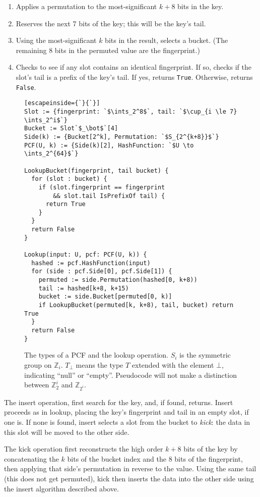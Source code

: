 \documentclass[letterpaper, 11pt]{article}
\newcommand{\ints}{\mathbb{Z}}
\begin{document}
\begin{enumerate}
\item Applies a permutation to the most-significant $k+8$ bits in the key.
\item Reserves the next 7 bits of the key; this will be the key's tail.
\item Using the most-significant $k$ bits in the result, selects a bucket.
(The remaining 8 bits in the permuted value are the fingerprint.)
\item Checks to see if any slot contains an identical fingerprint.
If so, checks if the slot's tail is a prefix of the key's tail.
If yes, returns \verb|True|.
Otherwise, returns \verb|False|.
\end{enumerate}

\begin{figure}
\begin{lstlisting}[escapeinside={`}{`}]
Slot := {fingerprint: `$\ints_2^8$`, tail: `$\cup_{i \le 7} \ints_2^i$`}
Bucket := Slot`$_\bot$`[4]
Side(k) := {Bucket[2^k], Permutation: `$S_{2^{k+8}}$`}
PCF(U, k) := {Side(k)[2], HashFunction: `$U \to \ints_2^{64}$`}

LookupBucket(fingerprint, tail bucket) {
  for (slot : bucket) {
    if (slot.fingerprint == fingerprint
        && slot.tail IsPrefixOf tail) {
      return True
    }
  }
  return False
}

Lookup(input: U, pcf: PCF(U, k)) {
  hashed := pcf.HashFunction(input)
  for (side : pcf.Side[0], pcf.Side[1]) {
    permuted := side.Permutation(hashed[0, k+8))
    tail := hashed[k+8, k+15)
    bucket := side.Bucket[permuted[0, k)]
    if LookupBucket(permuted[k, k+8), tail, bucket) return True
  }
  return False
}
\end{lstlisting}
\caption{The types of a PCF and the lookup operation.
  $S_i$ is the symmetric group on $\ints_i$.
  $T_\bot$ means the type $T$ extended with the element $\bot$, indicating ``null'' or ``empty''.
  Pseudocode will not make a distinction between $\ints_2^i$ and $\ints_{2^i}$.
}
\end{figure}

The insert operation, first search for the key, and, if found, returns.
Insert proceeds as in lookup, placing the key's fingerprint and tail in an empty slot, if one is.
If none is found, insert selects a slot from the bucket to {\em kick}: the data in this slot will be moved to the other side.

The kick operation first reconstructs the high order $k + 8$ bits of the key by concatenating the $k$ bits of the bucket index and the $8$ bits of the fingerprint, then applying that side's permutation in reverse to the value.
Using the same tail (this does not get permuted), kick then inserts the data into the other side using the insert algorithm described above.
\end{document}
